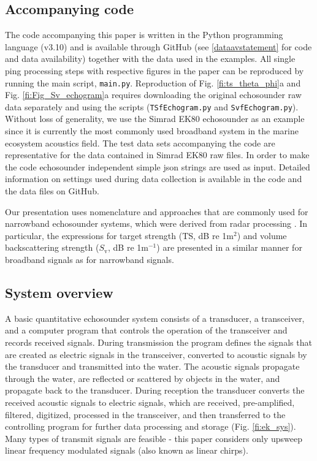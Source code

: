 \documentclass[preprint,12pt,TurnOnLineNumbers]{JASAnew}
\newcommand{\ek}{Simrad EK80}
\newcommand{\ts}{\textrm{TS}}
\newcommand{\sv}{S_{\textrm{v}}}
\newcommand{\code}[1]{\texttt{#1}}
\begin{document}
\subsection{Accompanying code}
The code  accompanying this paper is written in the Python programming language (v3.10) and is available through GitHub (see \ref{dataavstatement} for code and data availability) together with the data used in the examples. All single ping processing steps with respective figures in the paper can be reproduced by running the main script, \code{main.py}. Reproduction of Fig. \ref{fi:ts_theta_phi}a and Fig. \ref{fi:Fig_Sv_echogram}a requires downloading the original echosounder raw data separately and using the scripts (\code{TSfEchogram.py} and \code{SvfEchogram.py}). Without loss of generality, we use the \ek{} echosounder as an example since it is currently the most commonly used broadband system in the marine ecosystem acoustics field. The test data sets accompanying the code are representative for the data contained in Simrad EK80 raw files. In order to make the code echosounder independent simple json strings are used as input. Detailed information on settings used during data collection is available in the code and the data files on GitHub.

Our presentation uses nomenclature and approaches that are commonly used for narrowband echosounder systems, which were derived from radar processing \citep{cook1967}. In particular, the expressions for target strength ($\ts$, dB re 1m${^2}$) and volume backscattering strength ($\sv$, dB re 1m$^{-1}$) \citep{MacLennan2002consistent} are presented in a similar manner for broadband signals as for narrowband signals.

\subsection{System overview}
A basic quantitative echosounder system consists of a transducer, a transceiver, and a computer program that controls the operation of the transceiver and records received signals. During transmission the program defines the signals that are created as electric signals in the transceiver, converted to acoustic signals by the transducer and transmitted into the water. The acoustic signals propagate through the water, are reflected or scattered by objects in the water, and propagate back to the transducer. During reception the transducer converts the received acoustic signals to electric signals, which are received, pre-amplified, filtered, digitized, processed in the transceiver, and then transferred to the controlling program for further data processing and storage (Fig. \ref{fi:ek_sys}). Many types of transmit signals are feasible - this paper considers only upsweep linear frequency modulated signals (also known as linear chirps).
\end{document}
